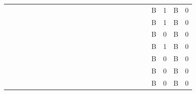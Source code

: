 \documentclass[empirical,issue, twocolumn,authordate]{jote-new-article}
\begin{document}
\begin{table}[t!]
\begin{tabular}{c  c  c  c  c  c  c  c  c  c  c  c  c  c  c  c  c  c}
  &   &   &   &   &   &   &   &   &   &   &   &   &   & B & 1 & B & 0\\
  &   &   &   &   &   &   &   &   &   &   &   &   &   & B & 1 & B & 0\\
  &   &   &   &   &   &   &   &   &   &   &   &   &   & B & 0 & B & 0\\
  &   &   &   &   &   &   &   &   &   &   &   &   &   & B & 1 & B & 0\\
  &   &   &   &   &   &   &   &   &   &   &   &   &   & B & 0 & B & 0\\
  &   &   &   &   &   &   &   &   &   &   &   &   &   & B & 0 & B & 0\\
  &   &   &   &   &   &   &   &   &   &   &   &   &   & B & 0 & B & 0\\
\bottomrule

\end{tabular}


\end{table}
\end{document}
